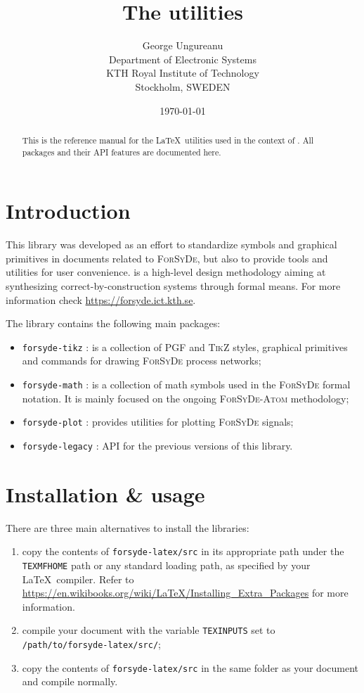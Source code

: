 \documentclass[10pt]{article}
\title{The \ForSyDeLaTeX utilities}
\author{
  George Ungureanu \\
  Department of Electronic Systems\\
  KTH Royal Institute of Technology\\
  Stockholm, SWEDEN
}
\date{\today}
\begin{document}
\maketitle
\reversemarginpar

\begin{abstract}
This is the reference manual for the \LaTeX\ utilities used in the context of \ForSyDe. All packages and their API features are documented here.
\end{abstract}

\section{Introduction}

This library was developed as an effort to standardize symbols and graphical primitives in documents related to \textsc{ForSyDe}, but also to provide tools and utilities for user convenience. \ForSyDe is a high-level design methodology aiming at synthesizing correct-by-construction systems through formal means. For more information check \url{https://forsyde.ict.kth.se}.

The library contains the following main packages:
\begin{itemize}
\item \texttt{forsyde-tikz} : is a collection of \textsc{PGF} and \textsc{TikZ} styles, graphical primitives and commands for drawing \textsc{ForSyDe} process networks;
\item \texttt{forsyde-math} : is a collection of math symbols used in the \textsc{ForSyDe} formal notation. It is mainly focused on the ongoing \textsc{ForSyDe-Atom} methodology;
\item \texttt{forsyde-plot} : provides utilities for plotting \textsc{ForSyDe} signals;
\item \texttt{forsyde-legacy} : API for the previous versions of this library.
\end{itemize}

\section{Installation \& usage}

There are three main alternatives to install the libraries:

\begin{enumerate}
\item copy the contents of \texttt{forsyde-latex/src} in its appropriate path under the \texttt{TEXMFHOME} path or any standard loading path, as specified by your \LaTeX\ compiler. Refer to \url{https://en.wikibooks.org/wiki/LaTeX/Installing_Extra_Packages} for more information.
\item compile your document with the variable \texttt{TEXINPUTS} set to \texttt{/path/to/forsyde-latex/src/}; %
\item copy the contents of \texttt{forsyde-latex/src} in the same folder as your document and compile normally.
\end{enumerate}
\end{document}
